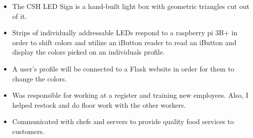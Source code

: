 \documentclass[10pt,a4paper]{altacv}
\begin{document}

\begin{itemize}
  \item The CSH LED Sign is a hand-built light box with geometric triangles cut out of it. 
  \item Strips of individually addressable LEDs respond to a raspberry pi 3B+ in order to shift colors and utilize an iButton reader to read an iButton and display the colors picked on an individuals profile.
  \item A user's profile will be connected to a Flask website in order for them to change the colors.

\end{itemize}









\begin{itemize}
	\item Was responsible for working at a register and training new employees. Also, I helped restock and do floor work with the other workers. 
\end{itemize}
%


\begin{itemize}
	\item Communicated with chefs and servers to provide quality food services to customers.
\end{itemize}
%
\end{document}
